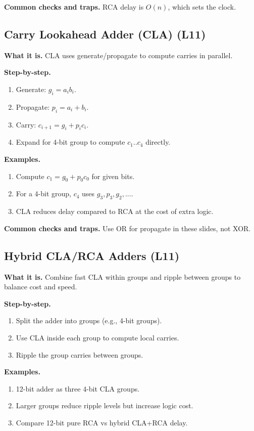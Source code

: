 \documentclass[11pt]{article}
\begin{document}
\textbf{Common checks and traps.} RCA delay is $O(n)$, which sets the clock.

\subsection{Carry Lookahead Adder (CLA) (L11)}
\textbf{What it is.} CLA uses generate/propagate to compute carries in parallel.

\textbf{Step-by-step.}
\begin{enumerate}[leftmargin=*]
  \item Generate: $g_i = a_i b_i$.
  \item Propagate: $p_i = a_i + b_i$.
  \item Carry: $c_{i+1} = g_i + p_i c_i$.
  \item Expand for 4-bit group to compute $c_1..c_4$ directly.
\end{enumerate}

\textbf{Examples.}
\begin{enumerate}[leftmargin=*]
  \item Compute $c_1 = g_0 + p_0 c_0$ for given bits.
  \item For a 4-bit group, $c_4$ uses $g_3, p_3, g_2, ...$.
  \item CLA reduces delay compared to RCA at the cost of extra logic.
\end{enumerate}

\textbf{Common checks and traps.} Use OR for propagate in these slides, not XOR.

\subsection{Hybrid CLA/RCA Adders (L11)}
\textbf{What it is.} Combine fast CLA within groups and ripple between groups to balance cost and speed.

\textbf{Step-by-step.}
\begin{enumerate}[leftmargin=*]
  \item Split the adder into groups (e.g., 4-bit groups).
  \item Use CLA inside each group to compute local carries.
  \item Ripple the group carries between groups.
\end{enumerate}

\textbf{Examples.}
\begin{enumerate}[leftmargin=*]
  \item 12-bit adder as three 4-bit CLA groups.
  \item Larger groups reduce ripple levels but increase logic cost.
  \item Compare 12-bit pure RCA vs hybrid CLA+RCA delay.
\end{enumerate}
\end{document}
